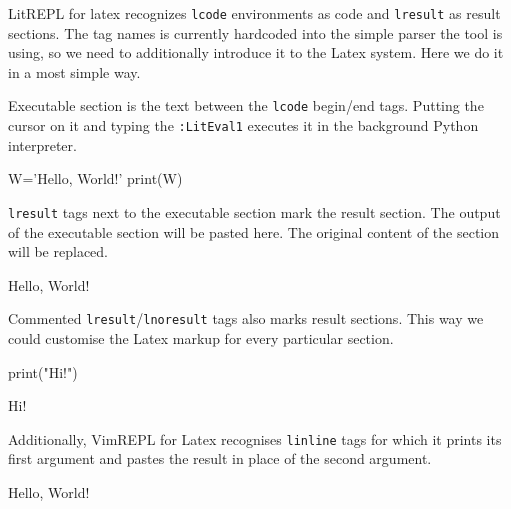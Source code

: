 \documentclass{article}
\begin{document}
LitREPL for latex recognizes \texttt{lcode} environments as code and
\texttt{lresult} as result sections. The tag names is currently hardcoded into
the simple parser the tool is using, so we need to additionally introduce it to
the Latex system. Here we do it in a most simple way.

\newenvironment{lcode}{\begin{texttt}}{\end{texttt}}
\newenvironment{lresult}{\begin{texttt}}{\end{texttt}}
\newcommand{\linline}[2]{#2}

Executable section is the text between the \texttt{lcode} begin/end tags.
Putting the cursor on it and typing the \texttt{:LitEval1} executes it in the
background Python interpreter.

\begin{lcode}
W='Hello, World!'
print(W)
\end{lcode}

\texttt{lresult} tags next to the executable section mark the result section.
The output of the executable section will be pasted here. The
original content of the section will be replaced.

\begin{lresult}
Hello, World!
\end{lresult}

Commented \texttt{lresult}/\texttt{lnoresult} tags also marks result sections.
This way we could customise the Latex markup for every particular section.

\begin{lcode}
print("Hi!")
\end{lcode}

Hi!

Additionally, VimREPL for Latex recognises \texttt{linline} tags for which it
prints its first argument and pastes the result in place of the second argument.

\linline{W}{Hello, World!}
\end{document}
